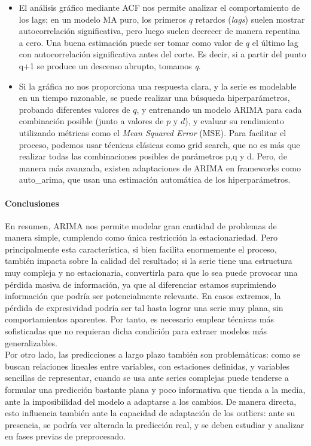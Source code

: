 	\begin{itemize}
		\item El análisis gráfico mediante ACF nos permite analizar el comportamiento de los lags; en un modelo MA puro, los primeros \( q \) retardos (\textit{lags}) suelen mostrar autocorrelación significativa, pero luego suelen decrecer de manera repentina a cero. Una buena estimación puede ser tomar como valor de \( q \)  el último lag con autocorrelación significativa antes del corte. Es decir, si a partir del punto q+1 se produce un descenso abrupto, tomamos \textit{q}.
		
		\item Si la gráfica no nos proporciona una respuesta clara, y la serie es modelable en un tiempo razonable, se puede realizar una búsqueda hiperparámetros, probando diferentes valores de \( q \), y entrenando un modelo ARIMA para cada combinación posible (junto a valores de \( p \) y \( d \)), y evaluar su rendimiento utilizando métricas como el \textit{Mean Squared Error} (MSE). Para facilitar el proceso, podemos usar técnicas clásicas como grid search, que no es más que realizar todas las combinaciones posibles de parámetros p,q y d. Pero, de manera más avanzada, existen adaptaciones de ARIMA en frameworks como auto\_arima,  que usan una estimación automática de los hiperparámetros.
	\end{itemize}
	

\paragraph{Conclusiones}


En resumen, ARIMA nos permite modelar gran cantidad de problemas de manera simple, cumplendo como única restricción la estacionariedad. Pero principalmente esta característica, si bien facilita enormemente el proceso, también impacta sobre la calidad del resultado; si la serie tiene una estructura muy compleja y no estacionaria, convertirla para que lo sea puede provocar una pérdida masiva de información, ya que al diferenciar estamos suprimiendo información que podría ser potencialmente relevante. En casos extremos, la pérdida de expresividad podría ser tal hasta lograr una serie muy plana, sin comportamientos aparentes. Por tanto, es necesario emplear técnicas más sofisticadas que no requieran dicha condición para extraer modelos más generalizables.\\

Por otro lado, las predicciones a largo plazo también son problemáticas: como se buscan relaciones lineales entre variables, con estaciones definidas, y variables sencillas de representar, cuando se usa ante series complejas puede tenderse a formular una predicción bastante plana y poco informativa que tienda a la media, ante la imposibilidad del modelo a adaptarse a los cambios. De manera directa, esto influencia también ante la capacidad de adaptación de los outliers: ante su presencia, se podría ver alterada la predicción real, y se deben estudiar y analizar en fases previas de preprocesado.\\

